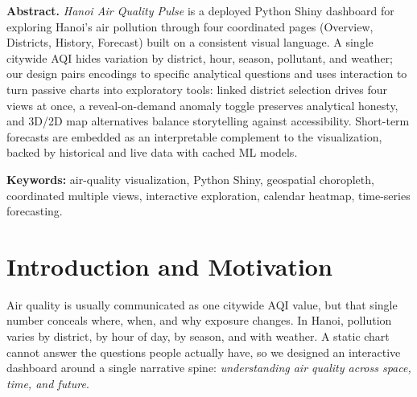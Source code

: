 \documentclass[a4paper]{article}
\begin{document}

\noindent\textbf{Abstract.}
\textit{Hanoi Air Quality Pulse} is a deployed Python Shiny dashboard for exploring Hanoi's air pollution
through four coordinated pages (Overview, Districts, History, Forecast) built on a consistent visual
language. A single citywide AQI hides variation by district, hour, season, pollutant, and weather; our
design pairs encodings to specific analytical questions and uses interaction to turn passive charts into
exploratory tools: linked district selection drives four views at once, a reveal-on-demand anomaly toggle
preserves analytical honesty, and 3D/2D map alternatives balance storytelling against accessibility.
Short-term forecasts are embedded as an interpretable complement to the visualization, backed by historical
and live data with cached ML models.

\smallskip
\noindent\textbf{Keywords:} air-quality visualization, Python Shiny, geospatial choropleth, coordinated
multiple views, interactive exploration, calendar heatmap, time-series forecasting.

\section{Introduction and Motivation}
Air quality is usually communicated as one citywide AQI value, but that single number conceals where,
when, and why exposure changes. In Hanoi, pollution varies by district, by hour of day, by season, and
with weather. A static chart cannot answer the questions people actually have, so we designed an
interactive dashboard around a single narrative spine: \emph{understanding air quality across space, time,
and future}.
\end{document}
